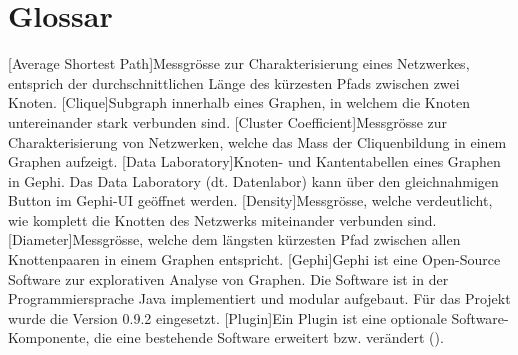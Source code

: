 \chapter*{Glossar}

\begin{acronym}
    [Average Shortest Path]{Messgrösse zur Charakterisierung eines Netzwerkes, entsprich der durchschnittlichen Länge des kürzesten Pfads zwischen zwei Knoten.}
    [Clique]{Subgraph innerhalb eines Graphen, in welchem die Knoten untereinander stark verbunden sind.}
    [Cluster Coefficient]{Messgrösse zur Charakterisierung von Netzwerken, welche das Mass der Cliquenbildung in einem Graphen aufzeigt.}
    [Data Laboratory]{Knoten- und Kantentabellen eines Graphen in Gephi. Das Data Laboratory (dt. Datenlabor) kann über den gleichnahmigen Button im Gephi-UI geöffnet werden.}
    [Density]{Messgrösse, welche verdeutlicht, wie komplett die Knotten des Netzwerks miteinander verbunden sind.}
    [Diameter]{Messgrösse, welche dem längsten kürzesten Pfad zwischen allen Knottenpaaren in einem Graphen entspricht.}
    [Gephi]{Gephi ist eine Open-Source Software zur explorativen
    Analyse von Graphen. Die Software ist in der Programmiersprache Java implementiert
    und modular aufgebaut. Für das Projekt wurde die Version 0.9.2 eingesetzt.}
    [Plugin]{Ein Plugin ist eine optionale Software-Komponente, die eine bestehende Software erweitert bzw. verändert (\cite{noauthor_plug-_2019}).}
\end{acronym}
